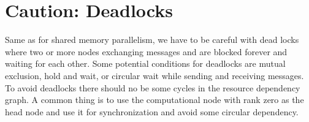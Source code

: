 \section{Caution: Deadlocks}
Same as for shared memory parallelism, we have to be careful with dead locks where two or more nodes exchanging messages and are blocked forever and waiting for each other. Some potential conditions for deadlocks are mutual exclusion, hold and wait, or circular wait while sending and receiving messages. To avoid deadlocks there should no be some cycles in the resource dependency graph. A common thing is to use the computational node with rank zero as the head node and use it for synchronization and avoid some circular dependency.










\newpage
\theendnotes